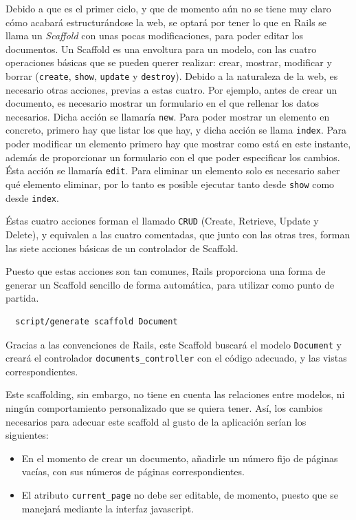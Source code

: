 Debido a que es el primer ciclo, y que de momento aún no se tiene muy claro cómo acabará estructurándose la web, se optará por tener lo que en Rails se llama un \emph{Scaffold} con unas pocas modificaciones, para poder editar los documentos. Un Scaffold es una envoltura para un modelo, con las cuatro operaciones básicas que se pueden querer realizar: crear, mostrar, modificar y borrar (\texttt{create}, \texttt{show}, \texttt{update} y \texttt{destroy}). Debido a la naturaleza de la web, es necesario otras acciones, previas a estas cuatro. Por ejemplo, antes de crear un documento, es necesario mostrar un formulario en el que rellenar los datos necesarios. Dicha acción se llamaría \texttt{new}. Para poder mostrar un elemento en concreto, primero hay que listar los que hay, y dicha acción se llama \texttt{index}. Para poder modificar un elemento primero hay que mostrar como está en este instante, además de proporcionar un formulario con el que poder especificar los cambios. Ésta acción se llamaría \texttt{edit}. Para eliminar un elemento solo es necesario saber qué elemento eliminar, por lo tanto es posible ejecutar tanto desde \texttt{show} como desde \texttt{index}.

Éstas cuatro acciones forman el llamado \texttt{CRUD} (Create, Retrieve, Update y Delete), y equivalen a las cuatro comentadas, que junto con las otras tres, forman las siete acciones básicas de un controlador de Scaffold.

Puesto que estas acciones son tan comunes, Rails proporciona una forma de generar un Scaffold sencillo de forma automática, para utilizar como punto de partida.

\begin{verbatim}
  script/generate scaffold Document
\end{verbatim}

Gracias a las convenciones de Rails, este Scaffold buscará el modelo \texttt{Document} y creará el controlador \texttt{documents\_controller} con el código adecuado, y las vistas correspondientes.

Este scaffolding, sin embargo, no tiene en cuenta las relaciones entre modelos, ni ningún comportamiento personalizado que se quiera tener. Así, los cambios necesarios para adecuar este scaffold al gusto de la aplicación serían los siguientes:

\begin{itemize}
  \item En el momento de crear un documento, añadirle un número fijo de páginas vacías, con sus números de páginas correspondientes.
  \item El atributo \texttt{current\_page} no debe ser editable, de momento, puesto que se manejará mediante la interfaz javascript.
\end{itemize}

